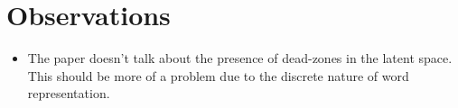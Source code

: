 \documentclass[12pt]{scrartcl}
\begin{document}
\section{Observations}
  \begin{itemize}
    \item The paper doesn't talk about the presence of dead-zones in the latent space. This should be more of a problem due to the discrete nature of word representation.
  \end{itemize}



\end{document}
